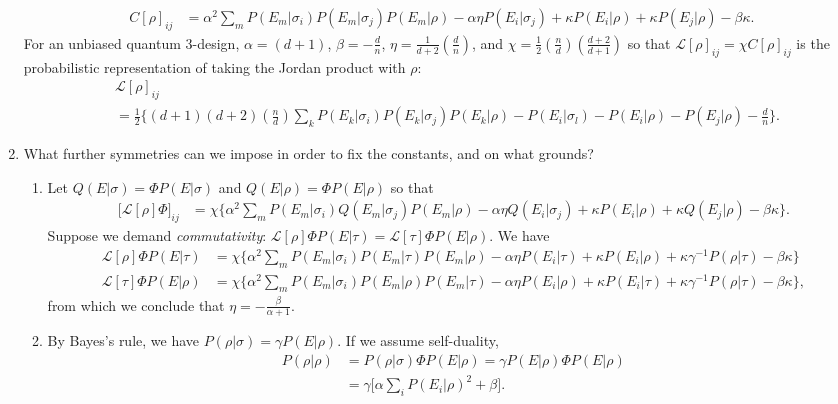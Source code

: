 \documentclass[11pt]{article}
\begin{document}
\begin{enumerate}
\begin{align}
C[\rho]_{ij}&=	\alpha^2 \sum_{m}P(E_m|\sigma_i) P(E_m|\sigma_j)P(E_m|\rho)-\alpha \eta  P(E_i|\sigma_j) +\kappa P(E_i|\rho)+ \kappa  P(E_j|\rho) -\beta \kappa.
\end{align}
For an unbiased quantum 3-design, $\alpha = (d+1)$, $\beta = -\frac{d}{n}$, $\eta =\frac{1}{d+2}\left(\frac{d}{n}\right)$, and $\chi= \frac{1}{2}\left(\frac{n}{d}\right)\left(\frac{d+2}{d+1}\right)$ so that $\mathcal{L}[\rho]_{ij}=\chi C[\rho]_{ij}$ is the probabilistic representation of taking the Jordan product with $\rho$:
\begin{align}
&\mathcal{L}[\rho]_{ij}\\
&=
\frac{1}{2}\Bigg\{(d+1)(d+2) \left(\frac{n}{d}\right)\sum_k P(E_k|\sigma_i)P(E_k|\sigma_j)P(E_k|\rho) -  P(E_i|\sigma_l)-P(E_i|\rho)-P(E_j|\rho) -\frac{d}{n}\Bigg\}\nonumber.
\end{align}
\item What further symmetries can we impose in order to fix the constants, and on what grounds?
\begin{enumerate}
\item 
 Let $Q(E|\sigma)=\Phi P(E|\sigma)$ and $Q(E|\rho)= \Phi P(E|\rho)$ so that
\begin{align}
\Big[\mathcal{L}[\rho]\Phi \Big]_{ij}&=	\chi\Bigg\{\alpha^2 \sum_{m}P(E_m|\sigma_i) Q(E_m|\sigma_j)P(E_m|\rho)-\alpha \eta  Q(E_i|\sigma_j) +\kappa P(E_i|\rho)+ \kappa  Q(E_j|\rho) -\beta \kappa\Bigg\}.
\end{align}
Suppose we demand \emph{commutativity}: $\mathcal{L}[\rho]\Phi P(E|\tau)=\mathcal{L}[\tau]\Phi P(E|\rho) $. We have
\begin{align}
\mathcal{L}[\rho]\Phi P(E|\tau) &=\chi\Bigg\{\alpha^2\sum_m P(E_m|\sigma_i)P(E_m|\tau)P(E_m|\rho)-\alpha \eta P(E_i|\tau)+\kappa P(E_i|\rho)+\kappa \gamma^{-1}P(\rho|\tau)-\beta \kappa\Bigg\}\\
\mathcal{L}[\tau]\Phi P(E|\rho) &=\chi\Bigg\{\alpha^2\sum_m P(E_m|\sigma_i)P(E_m|\rho)P(E_m|\tau)-\alpha \eta P(E_i|\rho)+\kappa P(E_i|\tau)+\kappa \gamma^{-1}P(\rho|\tau)-\beta \kappa\Bigg\},
\end{align}
from which we conclude that $\eta=-\frac{\beta}{\alpha+1}$.
\item By Bayes's rule, we have $P(\rho|\sigma)=\gamma P(E|\rho)$. If we assume self-duality,
\begin{align}
P(\rho|\rho)&=P(\rho|\sigma)\Phi P(E|\rho)=\gamma P(E|\rho)\Phi P(E|\rho)\\
&=\gamma \Bigg[\alpha \sum_i P(E_i|\rho)^2+\beta \Bigg].

\end{align}
\end{enumerate}
\end{enumerate}
\end{document}
